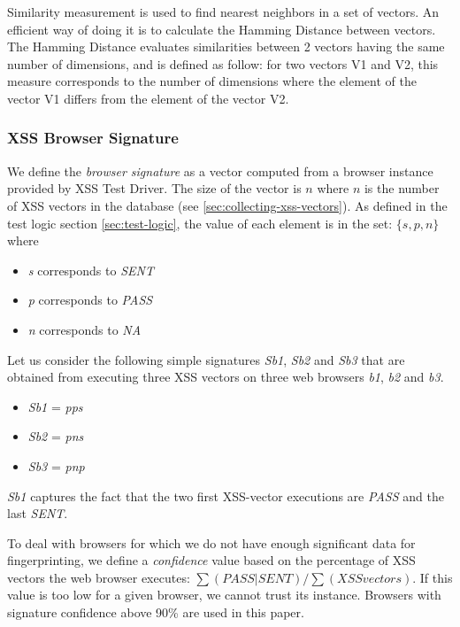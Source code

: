 \documentclass[10pt]{IEEEtran}
\begin{document}
Similarity measurement is used to find nearest neighbors in a set of vectors.
An efficient way of doing it is to calculate the Hamming Distance between vectors. 
The Hamming Distance evaluates similarities between 2 vectors having the same number of dimensions, and is defined as follow:
for two vectors V1 and V2, this measure corresponds to the number of dimensions where the element of the vector V1 differs from the element of the vector V2.


\subsubsection{XSS Browser Signature}


We define the \emph{browser signature} as a vector computed from a browser instance
provided by XSS Test Driver.
The size of the vector is $n$  where $n$ is the number of XSS vectors in the database 
(see \ref{sec:collecting-xss-vectors}).
As defined in the test logic section \ref{sec:test-logic}, the value of each element is in the set: $\{s,p,n\}$ where
\begin{itemize}
\item \emph{s} corresponds to \emph{SENT}
\item \emph{p} corresponds to \emph{PASS}
\item \emph{n} corresponds to \emph{NA}
\end{itemize}


Let us consider the following simple signatures \emph{Sb1}, \emph{Sb2} and \emph{Sb3} that are obtained from executing three XSS vectors on three web browsers \emph{b1}, \emph{b2} and \emph{b3}.
\begin{itemize}
\item \emph{Sb1} = \emph{pps}
\item \emph{Sb2} = \emph{pns}
\item \emph{Sb3} = \emph{pnp}
\end{itemize}

\emph{Sb1} captures the fact that the two first XSS-vector executions are \emph{PASS} and the last  \emph{SENT}.


To deal with browsers for which we do not have enough significant data for fingerprinting, 
we define a \emph{confidence} value based on the percentage of XSS vectors the web browser executes: $\sum(PASS|SENT)/\sum(XSS vectors)$. 
If this value is too 
low for a given browser, we cannot trust its instance. Browsers with signature 
confidence above 90\% are used in this paper. 
\end{document}
